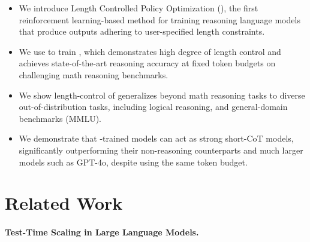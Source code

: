 \begin{itemize}
  \item We introduce Length Controlled Policy Optimization (\ours{}), the first reinforcement learning-based method for training reasoning language models that produce outputs adhering to user-specified length constraints.
  \item We use \ours{} to train \model{}, which demonstrates high degree of length control and achieves state-of-the-art reasoning accuracy at fixed token budgets on challenging math reasoning benchmarks.
  \item We show length-control of \model{} generalizes beyond math reasoning tasks to diverse out-of-distribution tasks, including logical reasoning, and general-domain benchmarks (MMLU).
  \item We demonstrate that \ours{}-trained models can act as strong short-CoT models, significantly outperforming their non-reasoning counterparts and much larger models such as GPT-4o, despite using the same token budget.
\end{itemize}

\section{Related Work}
\label{sec:related-work}

\paragraph{Test-Time Scaling in Large Language Models.}

